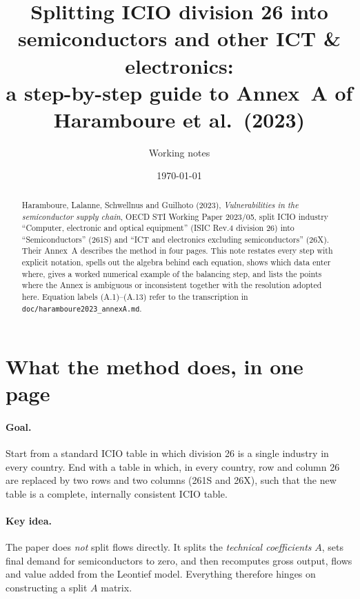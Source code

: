 \documentclass[11pt,a4paper]{article}
\title{Splitting ICIO division 26 into semiconductors and other ICT \& electronics:\\
a step-by-step guide to Annex~A of Haramboure et al.\ (2023)}
\author{Working notes}
\date{\today}
\theoremstyle{remark}
\theoremstyle{definition}
\newcommand{\sem}{{261S}}   %
\newcommand{\oth}{{26X}}    %
\begin{document}
\maketitle

\begin{abstract}
\noindent
Haramboure, Lalanne, Schwellnus and Guilhoto (2023), \emph{Vulnerabilities in the semiconductor supply chain},
OECD STI Working Paper 2023/05, split ICIO industry ``Computer, electronic and optical equipment'' (ISIC Rev.4
division 26) into ``Semiconductors'' (\sem) and ``ICT and electronics excluding semiconductors'' (\oth). Their
Annex~A describes the method in four pages. This note restates every step with explicit notation, spells out the
algebra behind each equation, shows which data enter where, gives a worked numerical example of the balancing
step, and lists the points where the Annex is ambiguous or inconsistent together with the resolution adopted
here. Equation labels (A.1)--(A.13) refer to the transcription in \texttt{doc/haramboure2023\_annexA.md}.
\end{abstract}

\tableofcontents
\newpage

\section{What the method does, in one page}

\paragraph{Goal.} Start from a standard ICIO table in which division 26 is a single industry in every country.
End with a table in which, in every country, row and column 26 are replaced by two rows and two columns
(\sem{} and \oth), such that the new table is a complete, internally consistent ICIO table.

\paragraph{Key idea.} The paper does \emph{not} split flows directly. It splits the \emph{technical
coefficients} $A$, sets final demand for semiconductors to zero, and then recomputes gross output, flows and
value added from the Leontief model. Everything therefore hinges on constructing a split $A$ matrix.
\end{document}
